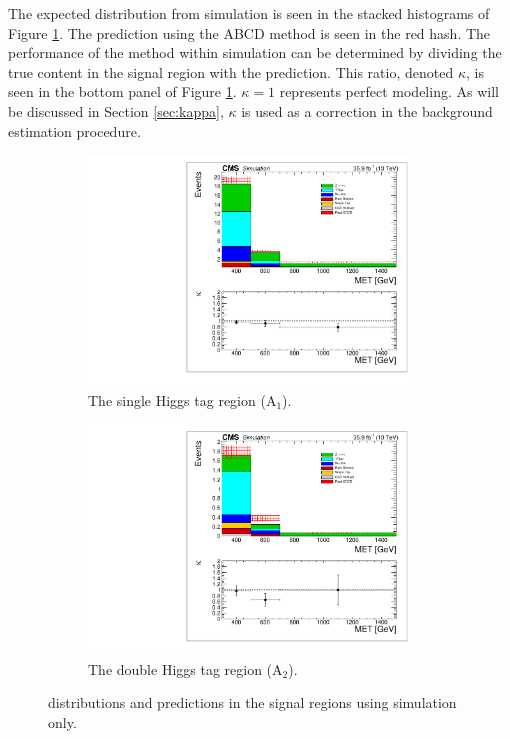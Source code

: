 The expected \ptmiss distribution from simulation is seen in the stacked histograms of Figure \ref{fig:mcclosure}. The prediction using the ABCD method is seen in the red hash. The performance of the method within simulation can be determined by dividing the true content in the signal region with the prediction. This ratio, denoted $\kappa$, is seen in the bottom panel of Figure \ref{fig:mcclosure}. $\kappa=1$ represents perfect modeling. As will be discussed in Section \ref{sec:kappa}, $\kappa$ is used as a correction in the background estimation procedure.

\begin{figure}[hb!]
\centering
\begin{subfigure}[b]{0.49\textwidth}
\centering
\includegraphics[trim={5px 5px 5px 5px},clip,width=0.95\textwidth]{figs/MCclosure_singleHiggsRegionTotal.pdf}
\caption{The single Higgs tag region (A$_{1}$).}
\end{subfigure}
\begin{subfigure}[b]{0.49\textwidth}
\centering
\includegraphics[trim={5px 5px 5px 5px},clip,width=0.95\textwidth]{figs/MCclosure_doubleHiggsRegionTotal.pdf} 
\caption{The double Higgs tag region (A$_{2}$).}
\end{subfigure}
\caption{\ptmiss distributions and predictions in the signal regions using simulation only.}
\label{fig:mcclosure}
\end{figure}


